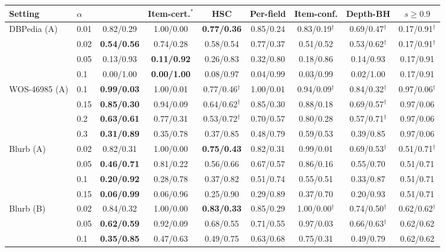 \begin{tabular}{llccccccc}
\toprule
Setting & $\alpha$ & \hlcl{} & Item-cert.$^\ast$ & HSC & Per-field & Item-conf. & Depth-BH & $s\ge0.9$ \\
\midrule
DBPedia (A) & 0.01 & 0.82/0.29 & 1.00/0.00 & \textbf{0.77/0.36} & 0.85/0.24 & 0.83/0.19$^\dagger$ & 0.69/0.47$^\dagger$ & 0.17/0.91$^\dagger$ \\
 & 0.02 & \textbf{0.54/0.56} & 0.74/0.28 & 0.58/0.54 & 0.77/0.37 & 0.51/0.52 & 0.53/0.62$^\dagger$ & 0.17/0.91$^\dagger$ \\
 & 0.05 & 0.13/0.93 & \textbf{0.11/0.92} & 0.26/0.83 & 0.32/0.80 & 0.18/0.86 & 0.14/0.93 & 0.17/0.91 \\
 & 0.1 & 0.00/1.00 & \textbf{0.00/1.00} & 0.08/0.97 & 0.04/0.99 & 0.03/0.99 & 0.02/1.00 & 0.17/0.91 \\
\midrule
WOS-46985 (A) & 0.1 & \textbf{0.99/0.03} & 1.00/0.01 & 0.77/0.46$^\dagger$ & 1.00/0.01 & 0.94/0.09$^\dagger$ & 0.84/0.32$^\dagger$ & 0.97/0.06$^\dagger$ \\
 & 0.15 & \textbf{0.85/0.30} & 0.94/0.09 & 0.64/0.62$^\dagger$ & 0.85/0.30 & 0.88/0.18 & 0.69/0.57$^\dagger$ & 0.97/0.06 \\
 & 0.2 & \textbf{0.63/0.61} & 0.77/0.31 & 0.53/0.72$^\dagger$ & 0.70/0.57 & 0.80/0.28 & 0.57/0.71$^\dagger$ & 0.97/0.06 \\
 & 0.3 & \textbf{0.31/0.89} & 0.35/0.78 & 0.37/0.85 & 0.48/0.79 & 0.59/0.53 & 0.39/0.85 & 0.97/0.06 \\
\midrule
Blurb (A) & 0.02 & 0.82/0.31 & 1.00/0.00 & \textbf{0.75/0.43} & 0.82/0.31 & 0.99/0.01 & 0.69/0.53$^\dagger$ & 0.51/0.71$^\dagger$ \\
 & 0.05 & \textbf{0.46/0.71} & 0.81/0.22 & 0.56/0.66 & 0.67/0.57 & 0.86/0.16 & 0.55/0.70 & 0.51/0.71 \\
 & 0.1 & \textbf{0.20/0.92} & 0.28/0.78 & 0.37/0.82 & 0.51/0.74 & 0.55/0.51 & 0.33/0.87 & 0.51/0.71 \\
 & 0.15 & \textbf{0.06/0.99} & 0.06/0.96 & 0.25/0.90 & 0.29/0.89 & 0.37/0.70 & 0.20/0.93 & 0.51/0.71 \\
\midrule
Blurb (B) & 0.02 & 0.84/0.32 & 1.00/0.00 & \textbf{0.83/0.33} & 0.85/0.29 & 1.00/0.00$^\dagger$ & 0.74/0.50$^\dagger$ & 0.62/0.62$^\dagger$ \\
 & 0.05 & \textbf{0.62/0.59} & 0.92/0.09 & 0.68/0.55 & 0.71/0.55 & 0.97/0.03 & 0.66/0.63$^\dagger$ & 0.62/0.62 \\
 & 0.1 & \textbf{0.35/0.85} & 0.47/0.63 & 0.49/0.75 & 0.63/0.68 & 0.75/0.31 & 0.49/0.79 & 0.62/0.62 \\

\end{tabular}
